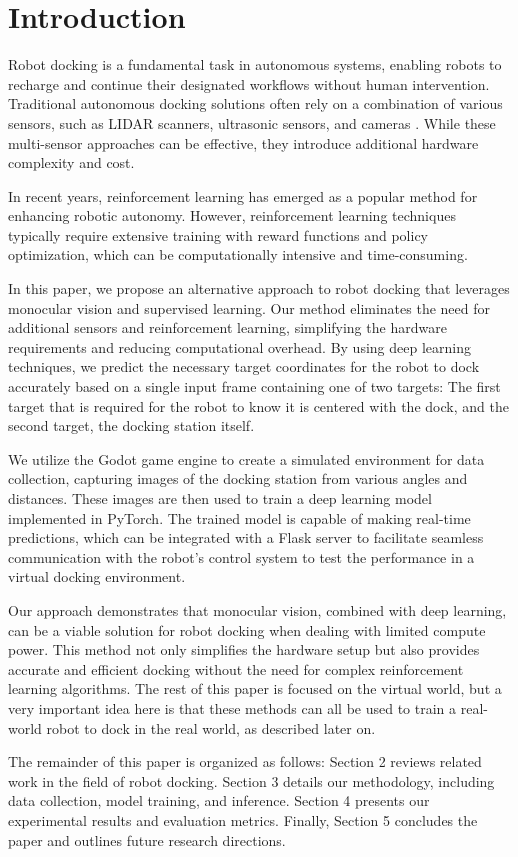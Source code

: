\section{Introduction}
Robot docking is a fundamental task in autonomous systems, enabling robots to recharge and continue their designated workflows without human intervention. Traditional autonomous docking solutions often rely on a combination of various sensors, such as LIDAR scanners, ultrasonic sensors, and cameras \citep{app131910675}. While these multi-sensor approaches can be effective, they introduce additional hardware complexity and cost.

In recent years, reinforcement learning has emerged as a popular method for enhancing robotic autonomy. However, reinforcement learning techniques typically require extensive training with reward functions and policy optimization, which can be computationally intensive and time-consuming.

In this paper, we propose an alternative approach to robot docking that leverages monocular vision and supervised learning. Our method eliminates the need for additional sensors and reinforcement learning, simplifying the hardware requirements and reducing computational overhead. By using deep learning techniques, we predict the necessary target coordinates for the robot to dock accurately based on a single input frame containing one of two targets: The first target that is required for the robot to know it is centered with the dock, and the second target, the docking station itself.

We utilize the Godot game engine to create a simulated environment for data collection, capturing images of the docking station from various angles and distances. These images are then used to train a deep learning model implemented in PyTorch. The trained model is capable of making real-time predictions, which can be integrated with a Flask server to facilitate seamless communication with the robot's control system to test the performance in a virtual docking environment.

Our approach demonstrates that monocular vision, combined with deep learning, can be a viable solution for robot docking when dealing with limited compute power. This method not only simplifies the hardware setup but also provides accurate and efficient docking without the need for complex reinforcement learning algorithms. The rest of this paper is focused on the virtual world, but a very important idea here is that these methods can all be used to train a real-world robot to dock in the real world, as described later on.

The remainder of this paper is organized as follows: Section 2 reviews related work in the field of robot docking. Section 3 details our methodology, including data collection, model training, and inference. Section 4 presents our experimental results and evaluation metrics. Finally, Section 5 concludes the paper and outlines future research directions.

